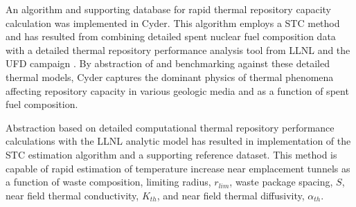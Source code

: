 
An algorithm and supporting database for rapid thermal repository capacity 
calculation was implemented in Cyder.  This algorithm employs a \gls{STC} 
method \cite{radel_effect_2007, radel_repository_2007} and has resulted from 
combining detailed spent nuclear fuel composition data \cite{carter_fuel_2011} 
with a detailed thermal repository performance analysis tool from \gls{LLNL} 
and the \gls{UFD} campaign \cite{greenberg_application_2012}. By abstraction of 
and benchmarking against these detailed thermal models, Cyder captures the 
dominant physics of thermal phenomena affecting repository capacity in various 
geologic media and as a function of spent fuel composition.

Abstraction based on detailed computational thermal repository performance 
calculations with the \gls{LLNL} analytic model has resulted in implementation 
of the \gls{STC} estimation algorithm and a supporting reference dataset.  This 
method is capable of rapid estimation of temperature increase near emplacement 
tunnels as a function of waste composition, limiting radius, $r_{lim}$, waste 
package spacing, $S$, near field thermal conductivity, $K_{th}$, and near field 
thermal diffusivity, $\alpha_{th}$.
